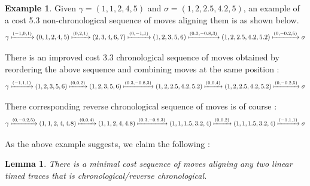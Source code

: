 \documentclass{article}
\newtheorem{lemma}[theorem]{Lemma}
\theoremstyle{Definition}
\theoremstyle{definition}
\newtheorem{example}{Example}
\begin{document}
	\begin{example}
		
		Given $\gamma = (1, 1, 2, 4, 5)$ and $\sigma = (1, 2, 2.5, 4.2, 5)$, an example of a cost 5.3 non-chronological sequence of moves aligning them is as shown below. 
		$$\gamma \xmapsto{(-1, 0, 1)} (0, 1, 2, 4, 5) \xmapsto{(0, 2, 1)} (2, 3, 4, 6, 7) \xmapsto{(0, -1, 1)} (1, 2, 3, 5, 6) \xmapsto{(0.3, -0.8, 3)} (1, 2, 2.5, 4.2, 5.2) \xmapsto{(0, -0.2, 5)} \sigma$$
		
		There is an improved cost 3.3 chronological sequence of moves obtained by reordering the above sequence and combining moves at the same position : 
		$$\gamma \xmapsto{(-1, 1, 1)} (1, 2, 3, 5, 6) \xmapsto{(0, 0, 2)} (1, 2, 3, 5, 6) \xmapsto{(0.3, -0.8, 3)} (1, 2, 2.5, 4.2, 5.2) \xmapsto{(0, 0, 4)} (1, 2, 2.5, 4.2, 5.2) \xmapsto{(0, -0.2, 5)} \sigma $$
		
		There corresponding reverse chronological sequence of moves is of course : 
		$$\gamma \xmapsto{(0, -0.2, 5)} (1, 1, 2, 4, 4.8) \xmapsto{(0, 0, 4)} (1, 1, 2, 4, 4.8) \xmapsto{(0.3, -0.8, 3)} (1, 1, 1.5, 3.2, 4)\xmapsto{(0, 0, 2)} (1, 1, 1.5, 3.2, 4)\xmapsto{(-1, 1, 1)} \sigma $$
		
	\end{example}
	
	As the above example suggests, we claim the following : 
	
	\begin{lemma}\label{linescommute} There is a minimal cost sequence of moves aligning any two linear timed traces that is chronological/reverse chronological. 
	\end{lemma}
	
\end{document}
